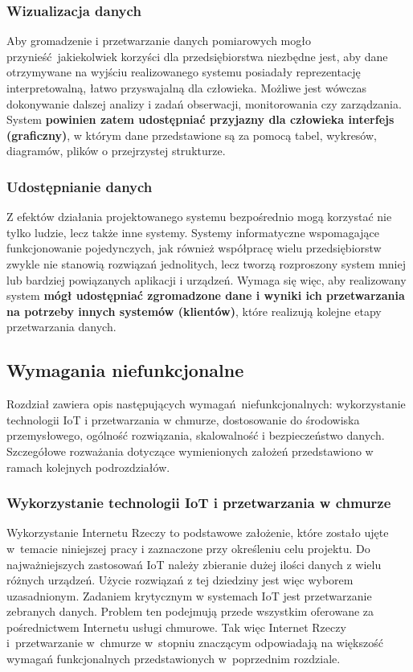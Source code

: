 \documentclass[a4paper, 12pt, twoside]{article}
\begin{document}
\subsubsection{Wizualizacja danych}

Aby gromadzenie i przetwarzanie danych pomiarowych mogło przynieść jakiekolwiek
korzyści dla przedsiębiorstwa niezbędne jest, aby dane otrzymywane na wyjściu realizowanego
systemu posiadały reprezentację interpretowalną, łatwo przyswajalną dla człowieka.
Możliwe jest wówczas dokonywanie dalszej analizy i zadań obserwacji, monitorowania
czy zarządzania. System \textbf{powinien zatem udostępniać przyjazny dla człowieka
      interfejs (graficzny)}, w którym dane przedstawione są za pomocą tabel, wykresów,
diagramów, plików o przejrzystej strukturze.

\subsubsection{Udostępnianie danych}

Z efektów działania projektowanego systemu bezpośrednio mogą korzystać nie tylko
ludzie, lecz także inne systemy. Systemy informatyczne wspomagające funkcjonowanie
pojedynczych, jak również współpracę wielu przedsiębiorstw zwykle nie stanowią
rozwiązań jednolitych, lecz tworzą rozproszony system mniej lub bardziej
powiązanych aplikacji i urządzeń. Wymaga się więc, aby realizowany system \textbf{mógł udostępniać
      zgromadzone dane i wyniki ich przetwarzania na potrzeby innych systemów (klientów)},
które realizują kolejne etapy przetwarzania danych.

\subsection{Wymagania niefunkcjonalne}

Rozdział zawiera opis następujących wymagań niefunkcjonalnych:
wykorzystanie technologii IoT i przetwarzania w chmurze, dostosowanie do środowiska
przemysłowego, ogólność rozwiązania, skalowalność i bezpieczeństwo danych. Szczegółowe
rozważania dotyczące wymienionych założeń przedstawiono w ramach kolejnych
podrozdziałów.

\subsubsection{Wykorzystanie technologii IoT i przetwarzania w chmurze}

Wykorzystanie Internetu Rzeczy to podstawowe założenie, które zostało ujęte
w~temacie niniejszej pracy i zaznaczone przy określeniu
celu projektu. Do najważniejszych zastosowań IoT należy zbieranie dużej ilości
danych z wielu różnych urządzeń. Użycie rozwiązań z tej dziedziny jest więc wyborem uzasadnionym.
Zadaniem krytycznym w systemach IoT jest przetwarzanie zebranych danych.
Problem ten podejmują przede wszystkim oferowane za pośrednictwem Internetu
usługi chmurowe. Tak więc Internet Rzeczy i~przetwarzanie w~chmurze w~stopniu
znaczącym odpowiadają na większość wymagań funkcjonalnych przedstawionych w~poprzednim rozdziale.
\end{document}
